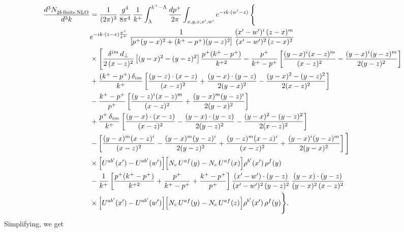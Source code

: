 \documentclass[9pt]{article}
\numberwithin{equation}{section}
\begin{document}
\begin{align}
\frac{d^{3}N_{2b\,\rm finite\, NLO}^{\rm}}{d^{3}k} & = \frac{1}{(2\pi)^{3}}\,\frac{g^{4}}{8\pi^{4}}\,\frac{1}{k^{+}}\int_{\Lambda}^{k^{+}-\Lambda}\frac{dp^{+}}{2\pi}\int_{x,y,z,x',w'}e^{-ik\cdot(w'-z)}\,\Bigg\{\notag\\
&e^{-ik\cdot(z-x)\frac{p^{+}}{k^{+}}}\,\frac{1}{\left[p^{+}(y-x)^{2}+(k^{+}-p^{+})(y-z)^{2}\right]}\,\frac{(x'-w')^{i}\,(z-x)^{m}}{(x'-w')^{2}\,(z-x)^{2}}\notag\\
&\times\Bigg[\frac{\delta^{im}\,d_{\perp}}{2\,(x-z)^{2}}\left[(y-x)^{2}-(y-z)^{2}\right]\frac{p^{+}(k^{+}-p^{+})}{k^{+2}}
-\frac{p^{+}}{k^{+}-p^{+}}\left[\frac{(y-x)^{i}(x-z)^{m}}{(x-z)^{2}}-\frac{(y-x)^{i}(y-z)^{m}}{2(y-z)^{2}}\right]\notag\\
&+\frac{(k^{+}-p^{+})\,\delta_{im}}{k^{+}}\left[\frac{(y-z)\cdot(x-z)}{(x-z)^{2}}+\frac{(y-x)\cdot(y-z)}{2(y-x)^{2}}-\frac{(y-x)^{2}-(y-z)^{2}}{2(x-z)^{2}}\right]\notag\\
&-\frac{k^{+}-p^{+}}{p^{+}}\left[\frac{(y-z)^{i}(x-z)^{m}}{(x-z)^{2}}+\frac{(y-x)^{m}(y-z)^{i}}{2(y-x)^{2}}\right]\notag\\
&+\frac{p^{+}\,\delta_{im}}{k^{+}}\left[\frac{(y-x)\cdot(x-z)}{(x-z)^{2}}-\frac{(y-x)\cdot(y-z)}{2(y-z)^{2}}-\frac{(y-x)^{2}-(y-z)^{2}}{2(x-z)^{2}}\right]\notag\\
&-\left[\frac{(y-x)^{m}(x-z)^{i}}{(x-z)^{2}}-\frac{(y-x)^{m}(y-z)^{i}}{2(y-z)^{2}}+\frac{(y-z)^{m}(x-z)^{i}}{(x-z)^{2}}+\frac{(y-x)^{i}(y-z)^{m}}{2(y-x)^{2}}\right]\Bigg]\notag\\
&\times\Big[U^{ab'}(x')-U^{ab'}(w')\Big]\Big[N_{c}\,U^{af}(y)-N_{c}\,U^{af}(x)\Big]\rho^{b'}(x')\,\rho^{f}(y)\notag\\
&-\frac{1}{k^{+}}\left[\frac{p^{+}(k^{+}-p^{+})}{k^{+2}}+\frac{p^{+}}{k^{+}-p^{+}}+\frac{k^{+}-p^{+}}{p^{+}}\right]
\frac{(x'-w')\cdot(y-z)}{(x'-w')^{2}\,(y-z)^{2}}\,\frac{(y-x)\cdot(y-z)}{(y-x)^{2}\,(x-z)^{2}}\notag\\
&\times\Big[U^{ab'}(x')-U^{ab'}(w')\Big]\Big[N_{c}\,U^{af}(y)-N_{c}\,U^{af}(z)\Big]\rho^{b'}(x')\,\rho^{f}(y)\Bigg\}.
\end{align}
Simplifying, we get
\end{document}
